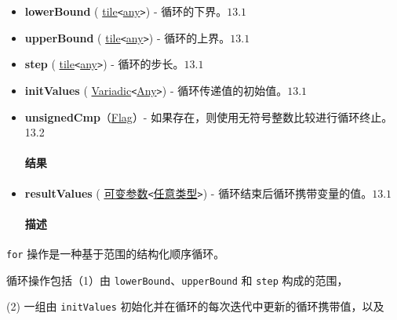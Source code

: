\documentclass{article}
\begin{document}
\begin{itemize}
\item \textbf{lowerBound} ( \href{https://docs.nvidia.com/cuda/tile-ir/latest/sections/types.html#type-tile}{tile}\texttt{<}\href{https://docs.nvidia.com/cuda/tile-ir/latest/sections/operations.html#type-any}{any}\texttt{>}) - 循环的下界。$\boxed{13.1}$
\item \textbf{upperBound} ( \href{https://docs.nvidia.com/cuda/tile-ir/latest/sections/types.html#type-tile}{tile}\texttt{<}\href{https://docs.nvidia.com/cuda/tile-ir/latest/sections/operations.html#type-any}{any}\texttt{>}) - 循环的上界。$\boxed{13.1}$
\item \textbf{step} ( \href{https://docs.nvidia.com/cuda/tile-ir/latest/sections/types.html#type-tile}{tile}\texttt{<}\href{https://docs.nvidia.com/cuda/tile-ir/latest/sections/operations.html#type-any}{any}\texttt{>}) - 循环的步长。$\boxed{13.1}$
\item \textbf{initValues} ( \href{https://docs.nvidia.com/cuda/tile-ir/latest/sections/operations.html#type-variadic}{Variadic}\texttt{<}\href{https://docs.nvidia.com/cuda/tile-ir/latest/sections/operations.html#type-any}{Any}\texttt{>}) - 循环传递值的初始值。$\boxed{13.1}$
\item \textbf{unsignedCmp}（\href{https://docs.nvidia.com/cuda/tile-ir/latest/sections/operations.html#type-flag}{Flag}）- 如果存在，则使用无符号整数比较进行循环终止。13.2


\paragraph{结果}

\item \textbf{resultValues} ( \href{https://docs.nvidia.com/cuda/tile-ir/latest/sections/operations.html#type-variadic}{可变参数}\texttt{<}\href{https://docs.nvidia.com/cuda/tile-ir/latest/sections/operations.html#type-any}{任意类型}\texttt{>}) - 循环结束后循环携带变量的值。$\boxed{13.1}$


\paragraph{描述}

\end{itemize}
\texttt{for} 操作是一种基于范围的结构化顺序循环。


循环操作包括（1）由 \texttt{lowerBound}、\texttt{upperBound} 和 \texttt{step} 构成的范围，

(2) 一组由 \texttt{initValues} 初始化并在循环的每次迭代中更新的循环携带值，以及
\end{document}

